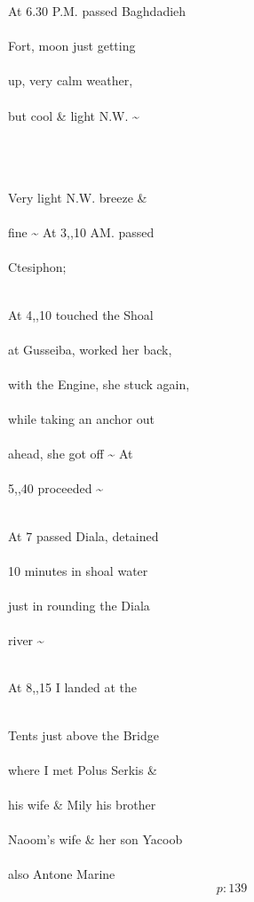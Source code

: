\documentclass{report}
\begin{document}
	\par{
 	At 6.30 P.M. passed Baghdadieh\ \\\ \\Fort, moon just getting\ \\\ \\up, very calm weather,\ \\\ \\but cool \& light N.W. \~{}\ \\\ \\\ \\\ \\
	}

	\par{
 	Very light N.W. breeze \&\ \\\ \\fine \~{} At 3,,10 AM. passed\ \\\ \\Ctesiphon;\ \\\ \\
	}

	\par{
 	At 4,,10 touched the Shoal\ \\\ \\at Gusseiba, worked her back,\ \\\ \\with the Engine, she stuck again,\ \\\ \\while taking an anchor out\ \\\ \\ahead, she got off \~{} At\ \\\ \\5,,40 proceeded \~{}\ \\\ \\
	}

	\par{
 	At 7 passed Diala, detained\ \\\ \\10 minutes in shoal water\ \\\ \\just in rounding the Diala\ \\\ \\river \~{}\ \\\ \\
	}

	\par{
 	At 8,,15 I landed at the\ \\\ \\
	}

	\par{
 	Tents just above the Bridge\ \\\ \\where I met Polus Serkis \&\ \\\ \\his wife \& Mily his brother\ \\\ \\Naoom’s wife \& her son Yacoob\ \\\ \\also Antone Marine\ \\
  \[p: 139 \]

	}
\end{document}
